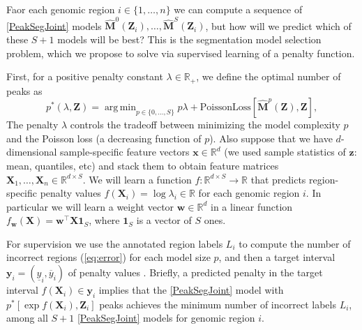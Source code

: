 \documentclass{article} %
\DeclareMathOperator*{\argmin}{arg\,min}
\newcommand{\RR}{\mathbb R}
\begin{document}
Faor each genomic region $i\in\{1,\dots,n\}$ we can compute a sequence
of \ref{PeakSegJoint} models $\mathbf{\hat M}^0(\mathbf Z_i),\dots,
\mathbf{\hat M}^S(\mathbf Z_i)$, but how will we predict which of
these $S+1$ models will be best?
This is the segmentation model selection problem, which we propose to
solve via supervised learning of a penalty function.

First, for a positive penalty constant $\lambda\in\RR_+$, we define
the optimal number of peaks as
\begin{equation}
  \label{eq:optimal_segments}
  p^*(\lambda, \mathbf Z) =
  \argmin_{p\in\{0, \dots, S\}}
  p \lambda + 
  \text{PoissonLoss}\left[
    \mathbf{\hat M}^p(\mathbf Z),
    \mathbf Z
  \right],
\end{equation}
The penalty $\lambda$ controls the tradeoff between minimizing the
model complexity $p$ and the \mbox{Poisson} loss (a decreasing
function of $p$).  Also suppose that we have   $d$-dimensional
sample-specific feature vectors $\mathbf x\in\RR^d$ (we used sample
statistics of $\mathbf z$: mean, quantiles, etc) and stack them
to obtain feature matrices $\mathbf X_1,\dots, \mathbf
X_n\in\RR^{d\times S}$. We will learn a function $f:\RR^{d\times
  S}\rightarrow\RR$ that predicts region-specific penalty values
$f(\mathbf X_i) = \log \lambda_i\in\RR$ for each genomic region
$i$. In particular we will learn a weight vector $\mathbf w\in\RR^d$
in a linear function $f_{\mathbf w}(\mathbf X) = \mathbf w^\intercal
\mathbf X \mathbf 1_S$, where $\mathbf 1_S$ is a vector of $S$ ones.

For supervision we use the annotated region labels $L_i$ to compute
the number of incorrect regions (\ref{eq:error}) for each model size
$p$, and then a target interval $\mathbf y_i = ( \underline y_i,
\overline y_i )$ of penalty values \citep{HOCKING-penalties}.
Briefly, a predicted penalty in the target interval $f(\mathbf
X_i)\in\mathbf y_i$ implies that the \ref{PeakSegJoint} model with
$p^*\left[\exp f(\mathbf X_i), \mathbf Z_i\right]$ peaks achieves the
minimum number of incorrect labels $L_i$, among all $S+1$
\ref{PeakSegJoint} models for genomic region $i$.
\end{document}

